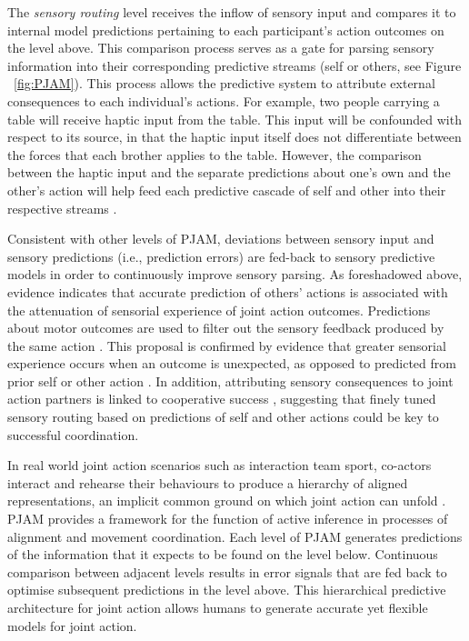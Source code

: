 \begin{CJK}{UTF8}{gbsn}
The \textit{sensory routing} level receives the inflow of sensory input and compares it to internal model predictions pertaining to each participant's action outcomes on the level above.  This comparison process serves as a gate for parsing sensory information into their corresponding predictive streams (self or others, see Figure ~\ref{fig:PJAM}). This process allows the predictive system to attribute external consequences to each individual’s actions.   For example, two people carrying a table will receive haptic input from the table. This input will be confounded with respect to its source, in that the haptic input itself does not differentiate between the forces that each brother applies to the table. However, the comparison between the haptic input and the separate predictions about one’s own and the other’s action will help feed each predictive cascade of self and other into their respective streams \citep{Pesquita2017}.

Consistent with other levels of PJAM, deviations between sensory input and sensory predictions (i.e., prediction errors) are fed-back to sensory predictive models in order to continuously improve sensory parsing.  As foreshadowed above, evidence indicates that accurate prediction of others' actions is associated with the attenuation of sensorial experience of joint action outcomes.  Predictions about motor outcomes are used to filter out the sensory feedback produced by the same action \citep{Blakemore1999}.  This proposal is confirmed by evidence that greater sensorial experience occurs when an outcome is unexpected, as opposed to predicted from prior self or other action \citep{Sato2008}.  In addition, attributing sensory consequences to joint action partners is linked to cooperative success \citep{Chaminade2012}, suggesting that finely tuned sensory routing based on predictions of self and other actions could be key to successful coordination.

In real world joint action scenarios such as interaction team sport, co-actors interact and rehearse their behaviours to produce a hierarchy of aligned representations, an implicit common ground on which joint action can unfold \citep{Noy2017}.  PJAM provides a framework for the function of active inference in processes of alignment and movement coordination.  Each level of PJAM generates predictions of the information that it expects to be found on the level below.  Continuous comparison between adjacent levels results in error signals that are fed back to optimise subsequent predictions in the level above.  This hierarchical predictive architecture for joint action allows humans to generate accurate yet flexible models for joint action.



\end{CJK}
